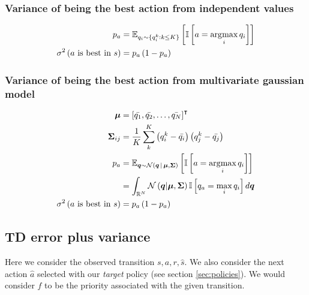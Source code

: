 \documentclass[10pt]{article}
\begin{document}
\subsubsection{Variance of being the best action from independent values}

\begin{align}
	p_a                                     & =
	\expected[q_i \sim \lbrace q^k_i : k \le K \rbrace]{\iverson{a = \argmax{i} q_i}} \\
	\func[\sigma^2]{a\text{ is best in } s} & = p_a \left(1 - p_a\right)
\end{align}

\subsubsection{Variance of being the best action from multivariate gaussian model}

\begin{align}
	\tensor{\mu}                            & = \trans{\left[ \bar{q_1}, \bar{q_2}, \ldots, \bar{q_N} \right]}                                 \\
	\tensor{\Sigma}_{ij}                    & = \frac{1}{K}\sum_{k}^{K}\left(q^k_i -\bar{q_i}\right) \left( q^k_j -\bar{q_j}\right)            \\
	p_a                                     & =
	\expected[{\tensor{q} \sim \func[\mathcal{N}]{\tensor{q} \cond \tensor{\mu}, \tensor{\Sigma} }}]{%
		\iverson{a = \argmax{i} q_i}}                                                                                                              \\
	                                        & = \int_{\mathbb{R}^N} \func[\mathcal{N}]{\tensor{q} \middle\vert \tensor{\mu}, \tensor{\Sigma} }
	\iverson{q_a = \max_{i} q_i}
	d\tensor{q}                                                                                                                                \\
	\func[\sigma^2]{a\text{ is best in } s} & = p_a \left(1 - p_a\right)
\end{align}

\subsection{TD error plus variance}

Here we consider the observed transition $s, a, r, \hat{s}$. We also consider
the next action $\hat{a}$ selected with our \emph{target} policy
(see section \ref{sec:policies}). We would consider $f$ to be the priority
associated with the given transition.
\end{document}
